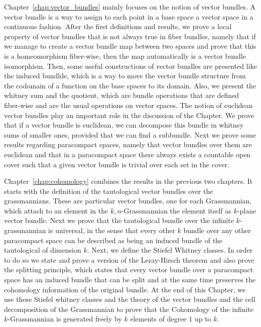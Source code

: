 Chapter~\ref{chap:vector_bundles} mainly focuses on the notion of vector bundles. A vector bundle is a way to assign to each point in a base space a vector space in a continuous fashion. After the first definitions and results, we prove a local property of vector bundles that is not always true in fiber bundles, namely that if we manage to create a vector bundle map between two spaces and prove that this is a homeomorphism fiber-wise, then the map automatically is a vector bundle isomorphism. Then, some useful constructions of vector bundles are presented like the induced bundlde, which is a way to move the vector bundle structure from the codomain of a function on the base spaces to its domain. Also, we present the whitney sum and the quotient, which are bundle operations that are defined fiber-wise and are the usual operations on vector spaces. The notion of euclidean vector bundles play an important role in the discussion of the Chapter. We prove that if a vector bundle is euclidean, we can decompose this bundle in whitney sums of smaller ones, provided that we can find a subbundle. Next we prove some results regarding paracompact spaces, namely that vector bundles over them are euclidean and that in a paracompact space there always exists a countable open cover such that a given vector bundle is trivial over each set in the cover.

Chapter~\ref{chap:cohomology} combines the results in the previous two chapters. It starts with the definition of the tautological vector bundles over the grassmannians. These are particular vector bundles, one for each Grassmannian, which attach to an element in the $k,n$-Grassmannian the element itself as $k$-plane vector bundle. Next we prove that the tautological bundle over the infinite $k$-grassmannian is universal, in the sense that every other $k$ bundle over any other paracompact space can be described as being an induced bundle of the tautological of dimension $k$. Next, we define the Stiefel Whitney classes. In order to do so we state and prove a version of the Leray-Hirsch theorem and also prove the splitting principle, which states that every vector bundle over a paracompact space has an induced bundle that can be split and at the same time preserves the cohomology information of the original bundle. At the end of this Chapter, we use these Stiefel whitney classes and the theory of the vector bundles and the cell decomposition of the Grassmannian to prove that the Cohomology of the infinite $k$-Grassmannian is generated freely by $k$ elements of degree $1$ up to $k$.
